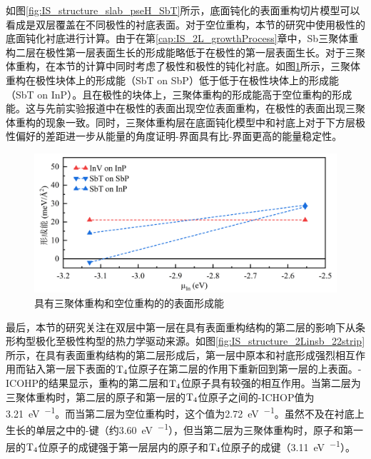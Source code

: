 如图\ref{fig:IS_structure_slab_pseH_SbT}所示，底面钝化的表面重构切片模型可以看成是双层覆盖在不同极性的衬底表面。对于空位重构，本节的研究中使用极性的底面钝化衬底进行计算。由于在第\ref{cap:IS_2L_growthProcess}章中，{Sb}三聚体重构二层在极性第一层表面生长的形成能略低于在极性的第一层表面生长。对于三聚体重构，在本节的计算中同时考虑了极性和极性的钝化衬底。如图\ref{fig:IS_DFT_surfaceE_InVSbT}所示，三聚体重构在极性块体上的形成能（SbT on SbP）低于低于在极性块体上的形成能（SbT on InP）。且在极性的块体上，三聚体重构的形成能高于空位重构的形成能。这与先前实验报道中在极性的表面出现空位表面重构，在极性的表面出现三聚体重构的现象一致。同时，三聚体重构层在底面钝化模型中和衬底上对于下方层极性偏好的差距进一步从能量的角度证明-界面具有比-界面更高的能量稳定性。

\begin{figure}[!htb]
    \includegraphics{pic/IS_DFT_surfaceE_InVSbT.png}
    \caption{具有三聚体重构和空位重构的的表面形成能}
    \label{fig:IS_DFT_surfaceE_InVSbT}
\end{figure}

最后，本节的研究关注在双层中第一层在具有表面重构结构的第二层的影响下从条形构型极化至极性构型的热力学驱动来源。如图\ref{fig:IS_structure_2Linsb_22strip}所示，在具有表面重构结构的第二层形成后，第一层中原本和衬底形成强烈相互作用而钻入第一层下表面的$\rm T_{4} \it$位原子在第二层的作用下重新回到第一层的上表面。-ICOHP的结果显示，重构的第二层和$\rm T_{4} \it$位原子具有较强的相互作用。当第二层为三聚体重构时，第二层的原子和第一层的$\rm T_{4} \it$位原子之间的-ICHOP值为\SI{3.21}{\electronvolt\per\pair}。而当第二层为空位重构时，这个值为\SI{2.72}{\electronvolt\per\pair}。虽然不及在衬底上生长的单层之中的-键（约\SI{3.60}{\electronvolt\per\pair}），但当第二层为三聚体重构时，原子和第一层的$\rm T_{4} \it$位原子的成键强于第一层层内的原子和$\rm T_{4} \it$位原子的成键（\SI{3.11}{\electronvolt\per\pair}）。

